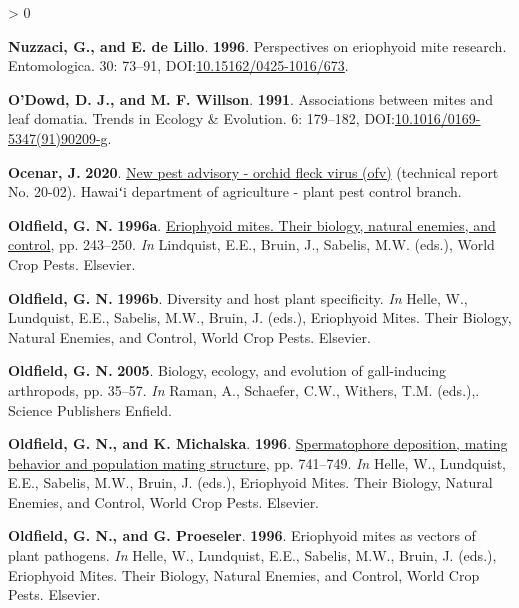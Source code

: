 \documentclass{ufdissertation}[overrideChapters] %
\newlength{\cslhangindent}
\newenvironment{CSLReferences}[2] %
 {%
  \setlength{\parindent}{0pt}
  \ifodd #1 \everypar{\setlength{\hangindent}{\cslhangindent}}\ignorespaces\fi
  \ifnum #2 > 0
  \setlength{\parskip}{#2\baselineskip}
  \fi
 }%
 {}
\begin{document}
{\begin{CSLReferences}{1}{1}
\leavevmode{}%
\textbf{Nuzzaci, G., and E. de Lillo}. \textbf{1996}. Perspectives on eriophyoid mite research. Entomologica. 30: 73--91, DOI:\href{https://doi.org/10.15162/0425-1016/673}{10.15162/0425-1016/673}.

\leavevmode{}%
\textbf{O'Dowd, D. J., and M. F. Willson}. \textbf{1991}. Associations between mites and leaf domatia. Trends in Ecology {\&} Evolution. 6: 179--182, DOI:\href{https://doi.org/10.1016/0169-5347(91)90209-g}{10.1016/0169-5347(91)90209-g}.

\leavevmode{}%
\textbf{Ocenar, J.} \textbf{2020}. \href{https://hdoa.hawaii.gov/pi/files/2020/08/NPA-20-02-Orchid-fleck-virus.pdf}{New pest advisory - orchid fleck virus (ofv)} (technical report No. 20-02). Hawaiʻi department of agriculture - plant pest control branch.

\leavevmode{}%
\textbf{Oldfield, G. N.} \textbf{1996a}. \href{https://doi.org/10.1016/s1572-4379(96)80015-7}{Eriophyoid mites. Their biology, natural enemies, and control}, pp. 243--250. \emph{In} Lindquist, E.E., Bruin, J., Sabelis, M.W. (eds.), World Crop Pests. Elsevier.

\leavevmode{}%
\textbf{Oldfield, G. N.} \textbf{1996b}. Diversity and host plant specificity. \emph{In} Helle, W., Lundquist, E.E., Sabelis, M.W., Bruin, J. (eds.), Eriophyoid Mites. Their Biology, Natural Enemies, and Control, World Crop Pests. Elsevier.

\leavevmode{}%
\textbf{Oldfield, G. N.} \textbf{2005}. Biology, ecology, and evolution of gall-inducing arthropods, pp. 35--57. \emph{In} Raman, A., Schaefer, C.W., Withers, T.M. (eds.),. Science Publishers Enfield.

\leavevmode{}%
\textbf{Oldfield, G. N., and K. Michalska}. \textbf{1996}. \href{https://doi.org/10.1016/s1572-4379(96)80050-9}{Spermatophore deposition, mating behavior and population mating structure}, pp. 741--749. \emph{In} Helle, W., Lundquist, E.E., Sabelis, M.W., Bruin, J. (eds.), Eriophyoid Mites. Their Biology, Natural Enemies, and Control, World Crop Pests. Elsevier.

\leavevmode{}%
\textbf{Oldfield, G. N., and G. Proeseler}. \textbf{1996}. Eriophyoid mites as vectors of plant pathogens. \emph{In} Helle, W., Lundquist, E.E., Sabelis, M.W., Bruin, J. (eds.), Eriophyoid Mites. Their Biology, Natural Enemies, and Control, World Crop Pests. Elsevier.


\end{CSLReferences}}
\end{document}
